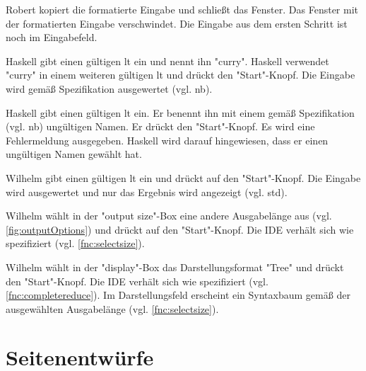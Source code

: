 \documentclass[parskip=full,11pt,twoside]{scrartcl}
\begin{document}
{Robert kopiert die formatierte Eingabe und schließt das Fenster.}
{Das Fenster mit der formatierten Eingabe verschwindet. 
 Die Eingabe aus dem ersten Schritt ist noch im Eingabefeld.}
 

{Haskell gibt einen gültigen \gls{lt} ein und nennt ihn "curry".
 Haskell verwendet "curry" in einem weiteren gültigen \gls{lt} und drückt den "Start"-Knopf.}
{Die Eingabe wird gemäß Spezifikation ausgewertet (vgl. \gls{nb}).}

{Haskell gibt einen gültigen \gls{lt} ein.
 Er benennt ihn mit einem gemäß Spezifikation (vgl. \gls{nb}) ungültigen Namen.
 Er drückt den "Start"-Knopf.}
{Es wird eine Fehlermeldung ausgegeben.
 Haskell wird darauf hingewiesen, dass er einen ungültigen Namen gewählt hat.}


{Wilhelm gibt einen gültigen \gls{lt} ein und drückt auf den "Start"-Knopf. }
{Die Eingabe wird ausgewertet und nur das Ergebnis wird angezeigt (vgl. \gls{std}).}

{Wilhelm wählt in der "output size"-Box eine andere Ausgabelänge aus (vgl. \ref{fig:outputOptions}) und drückt auf den "Start"-Knopf.}
{Die IDE verhält sich wie spezifiziert (vgl. \ref{fnc:selectsize}).}

{Wilhelm wählt in der "display"-Box das Darstellungsformat "Tree" und drückt den "Start"-Knopf.}
{Die IDE verhält sich wie spezifiziert (vgl. \ref{fnc:completereduce}).
 Im Darstellungsfeld erscheint ein Syntaxbaum gemäß der ausgewählten Ausgabelänge (vgl. \ref{fnc:selectsize}).}
%
%
%

\pagebreak
\appendix

\section{Seitenentwürfe}
\end{document}
